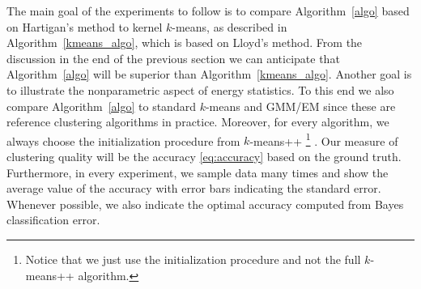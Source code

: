 \documentclass[aps,preprint,nofootinbib,floatfix]{revtex4-1}
\begin{document}
The main goal of the 
experiments  to follow
is to compare Algorithm~\ref{algo} based on Hartigan's method to
kernel $k$-means, as described in Algorithm~\ref{kmeans_algo}, which
is based on Lloyd's method. 
From the discussion in the end of the previous section we can anticipate
that Algorithm~\ref{algo} will be superior than Algorithm~\ref{kmeans_algo}.
Another goal is to illustrate the nonparametric aspect of energy statistics.
To this end we also compare
Algorithm~\ref{algo} to standard $k$-means and GMM/EM since 
these are reference
clustering algorithms in practice.
Moreover, for every algorithm, we always
choose the initialization procedure from $k$-means++%
\footnote{Notice that we just use the initialization
procedure and not the full $k$-means++ algorithm.} \cite{Vassilvitskii}.
Our measure of clustering quality will be the accuracy \eqref{eq:accuracy}
based on the ground truth. Furthermore, in every experiment, we sample
data many times and show the average value of the accuracy with error bars
indicating the standard error. Whenever possible, 
we also indicate the optimal 
accuracy computed from
Bayes classification error.
\end{document}
